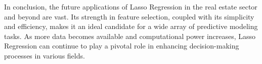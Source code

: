 \documentclass[12pt, a4paper]{report}
\begin{document}
In conclusion, the future applications of Lasso Regression in the real estate sector and beyond are vast. Its strength in feature selection, coupled with its simplicity and efficiency, makes it an ideal candidate for a wide array of predictive modeling tasks. As more data becomes available and computational power increases, Lasso Regression can continue to play a pivotal role in enhancing decision-making processes in various fields.
\end{document}
